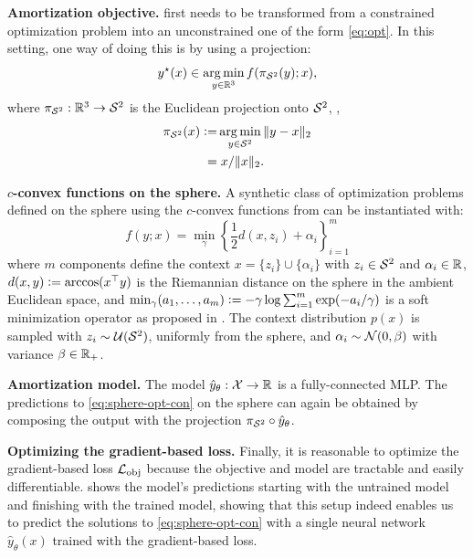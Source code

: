 \textbf{Amortization objective.}
 first needs to be transformed
from a constrained optimization problem into an unconstrained
one of the form \cref{eq:opt}.
In this setting, one way of doing this
is by using a projection:
\begin{equation}
  y^\star(x) \in \operatorname*{arg\,min}_{y\in\mathbb{R}^3} f(\pi_{{\mathcal{S}}^2}(y); x),
  \label{eq:sphere-opt-proj}
\end{equation}
where $\pi_{{\mathcal{S}}^2}: \mathbb{R}^3\rightarrow {\mathcal{S}}^2$ is the
Euclidean projection onto ${\mathcal{S}}^2$, \ie,
\begin{equation}
  \begin{aligned}
    \pi_{{\mathcal{S}}^2}(x)\vcentcolon=& \operatorname*{arg\,min}_{y\in{\mathcal{S}}^2} \|y-x\|_2 \\
     =& \;x/\|x\|_2.
  \end{aligned}
  \label{eq:pi}
\end{equation}

\textbf{$c$-convex functions on the sphere.}
A synthetic class of optimization problems defined
on the sphere using the $c$-convex functions from
\citet{cohen2021riemannian} can be instantiated with:
\begin{equation}
  f(y; x) = {\textstyle \min_{\gamma}} \left\{\frac{1}{2} d(x,z_i)+\alpha_i\right\}_{i=1}^m
  \label{eq:rcpm}
\end{equation}
where $m$ components define the context
$x=\{z_i\} \cup \{\alpha_i\}$
with $z_i\in{\mathcal{S}}^2$ and $\alpha_i\in\mathbb{R}$,
$d(x,y)\vcentcolon= \arccos(x^\top y)$ is the
Riemannian distance on the sphere in the
ambient Euclidean space, and
$\min_\gamma(a_1,\ldots,a_m)\vcentcolon= -\gamma\log\sum_{i=1}^m\exp(-a_i/\gamma)$
is a soft minimization operator
as proposed in \citet{cuturi2017soft}.
The context distribution $p(x)$ is sampled
with $z_i\sim {\mathcal{U}}({\mathcal{S}}^2)$, \ie uniformly from the sphere,
and $\alpha_i\sim{\mathcal{N}}(0,\beta)$
with variance $\beta\in\mathbb{R}_+$.

\textbf{Amortization model.}
The model $\hat y_\theta: {\mathcal{X}}\rightarrow\mathbb{R}$
is a fully-connected MLP.
The predictions to \cref{eq:sphere-opt-con}
on the sphere can again be obtained by composing
the output with the projection
$\pi_{{\mathcal{S}}^2}\circ \hat y_\theta$.

\textbf{Optimizing the gradient-based loss.}
Finally, it is reasonable to optimize the
gradient-based loss ${\mathcal{L}}_{\rm obj}$ because
the objective and model are tractable and
easily differentiable.
 shows the model's predictions
starting with the untrained model and finishing
with the trained model, showing that this setup
indeed enables us to predict the solutions to
\cref{eq:sphere-opt-con} with a single neural network
$\hat y_\theta(x)$ trained with the gradient-based loss.

